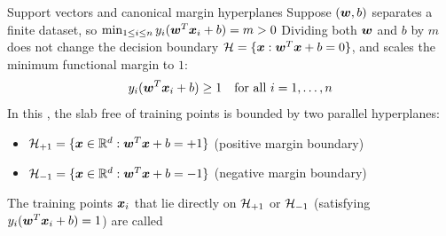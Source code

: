 \documentclass[aspectratio=169]{beamer}\usepackage[]{graphicx}\usepackage[]{xcolor}
\begin{document}
\begin{frame}{Support vectors and canonical margin hyperplanes}
    Suppose $(\bm{w}, b)$ separates a finite dataset, so $\min_{1 \le i \le n} y_i(\bm{w}^T \bm{x}_i + b) = m > 0$
    \vfill
    Dividing both $\bm{w}$ and $b$ by $m$ does not change the decision boundary $\mathcal{H} = \{\bm{x} : \bm{w}^T \bm{x} + b = 0\}$, and scales the minimum functional margin to $1$:
    \[
        y_i(\bm{w}^T \bm{x}_i + b) \ge 1 \quad \text{for all } i = 1, \ldots, n
    \]
    \vfill
    In this , the slab free of training points is bounded by two parallel hyperplanes:
    \begin{itemize}
        \item $\mathcal{H}_{+1} = \{\bm{x} \in \mathbb{R}^d : \bm{w}^T \bm{x} + b = +1\}$ (positive margin boundary)
        \item $\mathcal{H}_{-1} = \{\bm{x} \in \mathbb{R}^d : \bm{w}^T \bm{x} + b = -1\}$ (negative margin boundary)
    \end{itemize}
    \vfill
    The training points $\bm{x}_i$ that lie directly on $\mathcal{H}_{+1}$ or $\mathcal{H}_{-1}$ (satisfying $y_i(\bm{w}^T \bm{x}_i + b) = 1$) are called 
\end{frame}
\end{document}
